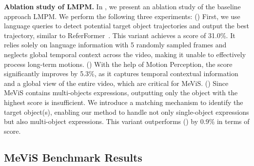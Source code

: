 \documentclass[10pt,twocolumn,letterpaper]{article}
\newcommand{\myparagraph}[1]{{\vspace{.5em} \noindent \bf #1}}
\newcommand{\ourdataset}{MeViS\xspace}
\newcommand{\ourmodel}{LMPM\xspace}
\begin{document}
\begin{table}[t]
   \renewcommand\arraystretch{1.06}
   \centering
   \small
   \caption{Ablation study of the baseline approach \ourmodel.}
  \vspace{-0.1in}
   \label{tab:TAM}\vspace{-5mm}
\end{table}



\myparagraph{Ablation study of \ourmodel.} 
In , we present an ablation study of the baseline approach \ourmodel. We perform the following three experiments:
() First, we use language queries to detect potential target object trajectories and output the best trajectory, similar to ReferFormer~\cite{wu2022referformer}. This variant achieves a  score of 31.0\%. It relies solely on language information with 5 randomly sampled frames and neglects global temporal context across the video, making it unable to effectively process long-term motions. () With the help of Motion Perception, the  score significantly improves by 5.3\%, as it captures temporal contextual information and a global view of the entire video, which are critical for \ourdataset. () Since \ourdataset contains multi-objects expressions, outputting only the object with the highest score is insufficient. We introduce a matching mechanism to identify the target object(s), enabling our method to handle not only single-object expressions but also multi-object expressions. This variant outperforms () by 0.9\% in terms of  score.



\vspace{1mm}
\subsection{\ourdataset Benchmark Results}
\vspace{-2mm}
\end{document}
